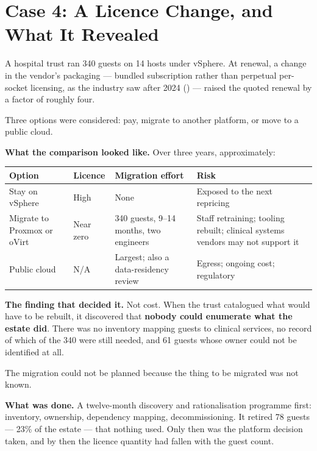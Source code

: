 \section{Case 4: A Licence Change, and What It Revealed}

\begin{conceptbox}
A hospital trust ran 340 guests on 14 hosts under vSphere. At renewal, a change
in the vendor's packaging --- bundled subscription rather than perpetual
per-socket licensing, as the industry saw after 2024 () ---
raised the quoted renewal by a factor of roughly four.

\smallskip
Three options were considered: pay, migrate to another platform, or move to a
public cloud.
\end{conceptbox}

\textbf{What the comparison looked like.} Over three years, approximately:

\begin{longtable}{@{}L{4.0cm}L{2.6cm}L{3.2cm}L{4.6cm}@{}}
\toprule
{}
\textbf{Option} & \textbf{Licence} & \textbf{Migration effort} &
\textbf{Risk} \\
\midrule
\endhead
Stay on vSphere & High & None & Exposed to the next repricing \\
Migrate to Proxmox or oVirt & Near zero & 340 guests, 9--14 months, two
engineers & Staff retraining; tooling rebuilt; clinical systems vendors may not
support it \\
Public cloud & N/A & Largest; also a data-residency review & Egress; ongoing
cost; regulatory \\
\bottomrule
\end{longtable}

\textbf{The finding that decided it.} Not cost. When the trust catalogued what
would have to be rebuilt, it discovered that \textbf{nobody could enumerate what
the estate did}. There was no inventory mapping guests to clinical services, no
record of which of the 340 were still needed, and 61 guests whose owner could
not be identified at all.

The migration could not be planned because the thing to be migrated was not
known.

\textbf{What was done.} A twelve-month discovery and rationalisation programme
first: inventory, ownership, dependency mapping, decommissioning. It retired 78
guests --- 23\% of the estate --- that nothing used. Only then was the platform
decision taken, and by then the licence quantity had fallen with the guest
count.

